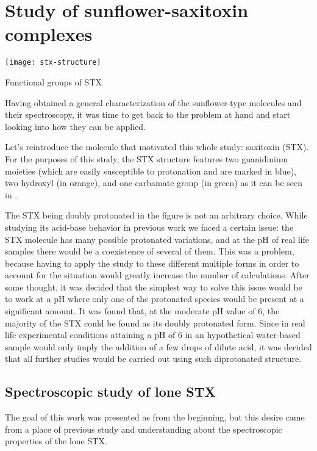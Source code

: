 \chapter{Study of sunflower-saxitoxin complexes}

\begin{marginfigure}
    \texttt{[image: stx-structure]}
    \caption[Functional groups of STX]{Functional groups of STX}
\end{marginfigure}

Having obtained a general characterization of the sunflower-type molecules and their spectroscopy, it was time to get back to the problem at hand and start looking into how they can be applied.

Let's reintroduce the molecule that motivated this whole study: saxitoxin (STX).
For the purposes of this study, the STX structure features two guanidinium moieties (which are easily susceptible to protonation and are marked in blue), two hydroxyl (in orange), and one carbamate group (in green) as it can be seen in .

The STX being doubly protonated in the figure is not an arbitrary choice.
While studying its acid-base behavior in previous work we faced a certain issue: the STX molecule has many possible protonated variations, and at the pH of real life samples there would be a coexistence of several of them.
This was a problem, because having to apply the study to these different multiple forms in order to account for the situation would greatly increase the number of calculations.
After some thought, it was decided that the simplest way to solve this issue would be to work at a pH where only one of the protonated species would be present at a significant amount.
It was found that, at the moderate pH value of 6, the majority of the STX could be found as its doubly protonated form.
Since in real life experimental conditions attaining a pH of 6 in an hypothetical water-based sample would only imply the addition of a few drops of dilute acid, it was decided that all further studies would be carried out using such diprotonated structure.

\section{Spectroscopic study of lone STX}
The goal of this work was presented as  from the beginning, but this desire came from a place of previous study and understanding about the spectroscopic properties of the lone STX.

